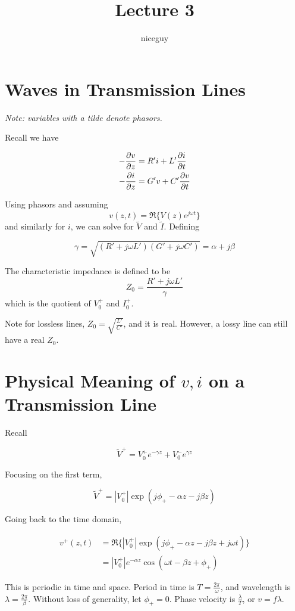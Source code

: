 \documentclass[12pt]{article}
\author{niceguy}
\title{Lecture 3}
\begin{document}
\section{Waves in Transmission Lines}

\textit{Note: variables with a tilde denote phasors.}

Recall we have

\begin{align}
    -\frac{\partial v}{\partial z} &= R'i + L'\frac{\partial i}{\partial t} \\
    -\frac{\partial i}{\partial z} &= G'v + C'\frac{\partial v}{\partial t}
\end{align}

Using phasors and assuming
$$v(z,t) = \Re\{V(z)e^{j\omega t}\}$$
and similarly for $i$, we can solve for $\tilde V$ and $\tilde I$. Defining

\begin{equation}
    \gamma = \sqrt{(R'+j\omega L')(G'+j\omega C')} = \alpha + j\beta
\end{equation}

\begin{defn}
    The characteristic impedance is defined to be
    \begin{equation}
        Z_0 = \frac{R' + j\omega L'}{\gamma}
    \end{equation}
    which is the quotient of $V_0^+$ and $I_0^+$.
\end{defn}

Note for lossless lines, $Z_0 = \sqrt{\frac{L'}{C'}}$, and it is real. However, a lossy line can still have a real $Z_0$.

\section{Physical Meaning of $v,i$ on a Transmission Line}

Recall

$$\tilde V^+ = V_0^+ e^{-\gamma z} + V_0^-e^{\gamma z}$$

Focusing on the first term,

$$\tilde V^+ = |V_0^+|\exp(j\phi_+ - \alpha z - j\beta z)$$

Going back to the time domain,

\begin{align*}
    v^+(z,t) &= \Re\{|V_0^+|\exp(j\phi_+ - \alpha z - j\beta z + j\omega t)\} \\
             &= |V_0^+|e^{-\alpha z} \cos(\omega t - \beta z + \phi_+)
\end{align*}

This is periodic in time and space. Period in time is $T = \frac{2\pi}{\omega}$, and wavelength is $\lambda = \frac{2\pi}{\beta}$. Without loss of generality, let $\phi_+ = 0$. Phase velocity is $\frac{\lambda}{T}$, or $v = f\lambda$.
\end{document}
